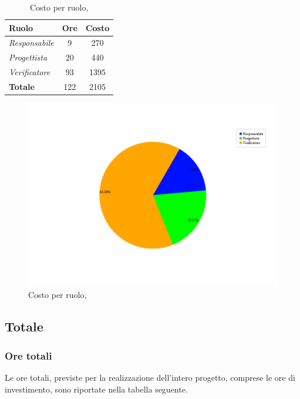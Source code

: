 \begin{table}[H]
	\begin{center}
		\begin{tabular}{|l|c|c|}
			\hline
			\textbf{Ruolo}	& \textbf{Ore} &	\textbf{Costo}	 \\
			\hline
			\textit{Responsabile}	&	9	&	270		\\
			\hline
			\textit{Progettista}		&	20	&	440		\\
			\hline
			\textit{Verificatore}	&	93	&	1395	\\
			\hline
			\textbf{Totale}	&	122	&	2105	\\
			\hline
		\end{tabular}
	\end{center}
	\caption{Costo per ruolo, \VV}
\end{table}

\begin{figure}[H]
	\centering
	\includegraphics[scale=0.5]{immagini/Grafi/CostoVV}
	\caption{Costo per ruolo, \VV}
\end{figure}

\newpage
\subsection{Totale}
\subsubsection{Ore totali}
Le ore totali, previste per la realizzazione dell'intero progetto, comprese le ore di investimento, sono riportate nella tabella seguente.

